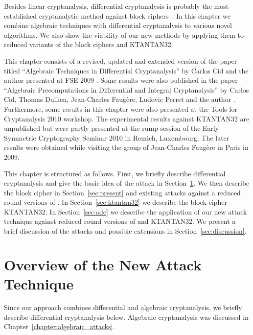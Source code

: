 Besides linear cryptanalysis, differential cryptanalysis is probably the most established cryptanalytic method against block ciphers~\cite{des-dc}. In this chapter we combine algebraic techniques with differential cryptanalysis to various novel algorithms. We also show the viability of our new methods by applying them to reduced variants of the block ciphers \PRESENT and KTANTAN32.

This chapter consists of a revised, updated and extended version of the paper titled ``Algebraic Techniques in Differential Cryptanalysis'' by Carlos Cid and the author presented at FSE 2009 \cite{adc:fse2009}. Some results were also published in the paper ``Algebraic Precomputations in Differential and Integral Cryptanalysis'' by Carlos Cid, Thomas Dullien, Jean-Charles Faugère, Ludovic Perret and the author \cite{acdfp:inscrypt2010}. Furthermore, some results in this chapter were also presented at the Tools for Cryptanalysis 2010 workshop. The experimental results against KTANTAN32 are unpublished but were partly presented at the rump session of the Early Symmetric Cryptography Seminar 2010 in Remich, Luxembourg. The later results were obtained while visiting the group of Jean-Charles Faugère in Paris in 2009.

This chapter is structured as follows. First, we briefly describe differential cryptanalysis and give the basic idea of the attack in Section~\ref{sec:overview}. We then describe the block cipher \PRESENT in Section~\ref{sec:present} and existing attacks against a reduced round versions of \PRESENT. In Section~\ref{sec:ktantan32} we describe the block cipher KTANTAN32. In Section~\ref{sec:adc} we describe the application of our new attack technique against reduced round versions of \PRESENT and KTANTAN32. We present a brief discussion of the attacks and possible extensions in Section~\ref{sec:discussion}.


\section{Overview of the New Attack Technique}
\label{sec:overview}
Since our approach combines differential and algebraic cryptanalysis, we briefly describe differential cryptanalysis below. Algebraic cryptanalysis was discussed in Chapter~\ref{chapter:algebraic_attacks}.

